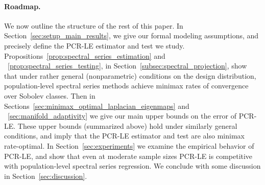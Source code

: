 \paragraph{Roadmap.}
We now outline the structure of the rest of this paper. In Section~\ref{sec:setup_main_results}, we give our formal modeling assumptions, and precisely define the PCR-LE estimator and test we study. Propositions~\ref{prop:spectral_series_estimation} and ~\ref{prop:spectral_series_testing}, in Section~\ref{subsec:spectral_projection}, show that under rather general (nonparametric) conditions on the design distribution, population-level spectral series methods achieve minimax rates of convergence over Sobolev classes. Then in Sections~\ref{sec:minimax_optimal_laplacian_eigenmaps} and ~\ref{sec:manifold_adaptivity} we give our main upper bounds on the error of PCR-LE. These upper bounds (summarized above) hold under similarly general conditions, and imply that the PCR-LE estimator and test are also minimax rate-optimal. In Section~\ref{sec:experiments} we examine the empirical behavior of PCR-LE, and show that even at moderate sample sizes PCR-LE is competitive with population-level spectral series regression. We conclude with some discussion in Section~\ref{sec:discussion}. 

